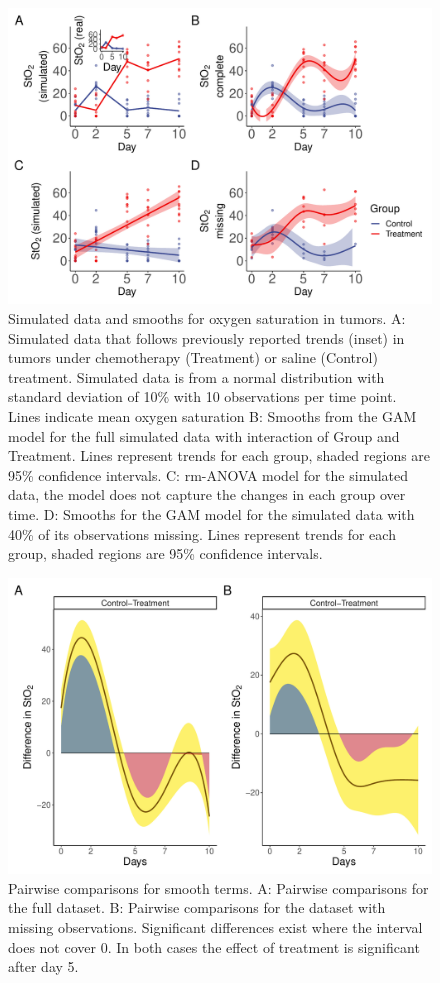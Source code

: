 \documentclass[
]{article}
\begin{document}
\begin{figure}[H]

{\centering \includegraphics[width=0.75\linewidth,]{Full_document_files/figure-latex/sim-smooth-plot-1} 

}

\caption{Simulated data and smooths for oxygen saturation in tumors. A: Simulated data that follows previously reported trends (inset) in tumors under chemotherapy (Treatment) or saline (Control) treatment. Simulated data is from a normal distribution with standard deviation of 10\% with 10 observations per time point. Lines indicate mean oxygen saturation B: Smooths from the GAM model for the full simulated data with interaction of Group and Treatment. Lines represent trends for each group, shaded regions are 95\% confidence intervals. C: rm-ANOVA model for the simulated data, the model does not capture the changes in each group over time. D: Smooths for the GAM model for the simulated data with 40\% of its observations missing. Lines represent trends for each group, shaded regions are 95\% confidence intervals.}\label{fig:sim-smooth-plot}
\end{figure}



\begin{figure}[H]

{\centering \includegraphics[width=0.75\linewidth,]{Full_document_files/figure-latex/plot-pairwise-comp-1} 

}

\caption{Pairwise comparisons for smooth terms. A: Pairwise comparisons for the full dataset. B: Pairwise comparisons for the dataset with missing observations. Significant differences exist where the interval does not cover 0. In both cases the effect of treatment is significant after day 5.}\label{fig:plot-pairwise-comp}
\end{figure}
\end{document}

